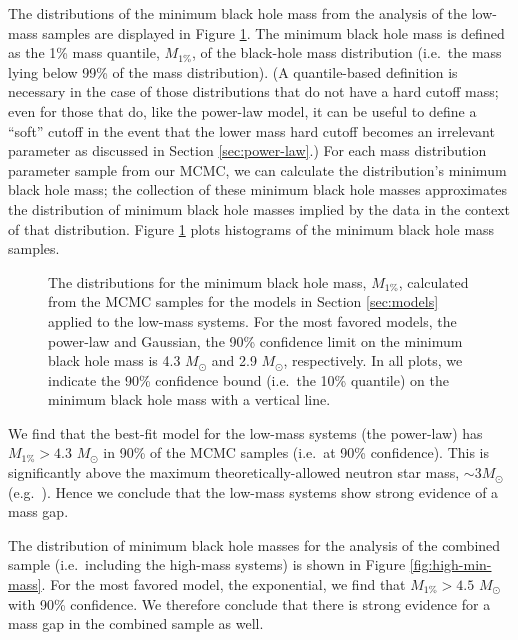 \documentclass[preprint]{aastex}
\newcommand{\Msun}{M_\odot}
\begin{document}
The distributions of the minimum black hole mass from the analysis of
the low-mass samples are displayed in Figure \ref{fig:min-mass}.  The
minimum black hole mass is defined as the 1\% mass quantile,
$M_{1\%}$, of the black-hole mass distribution (i.e.\ the mass lying
below 99\% of the mass distribution).  (A quantile-based definition is
necessary in the case of those distributions that do not have a hard
cutoff mass; even for those that do, like the power-law model, it can
be useful to define a ``soft'' cutoff in the event that the lower mass
hard cutoff becomes an irrelevant parameter as discussed in Section
\ref{sec:power-law}.)  For each mass distribution parameter sample
from our MCMC, we can calculate the distribution's minimum black hole
mass; the collection of these minimum black hole masses approximates
the distribution of minimum black hole masses implied by the data in
the context of that distribution.  Figure \ref{fig:min-mass} plots
histograms of the minimum black hole mass samples.

\begin{figure}
  \begin{center}
  \end{center}
  \caption{\label{fig:min-mass} The distributions for the minimum
    black hole mass, $M_{1\%}$, calculated from the MCMC samples for
    the models in Section \ref{sec:models} applied to the low-mass
    systems.  For the most favored models, the power-law and Gaussian,
    the 90\% confidence limit on the minimum black hole mass is 4.3
    $\Msun$ and 2.9 $\Msun$, respectively.  In all plots, we indicate
    the 90\% confidence bound (i.e.\ the 10\% quantile) on the minimum
    black hole mass with a vertical line.}
\end{figure}

We find that the best-fit model for the low-mass systems (the
power-law) has $M_{1\%} > 4.3$ $\Msun$ in 90\% of the MCMC samples
(i.e.\ at 90\% confidence).  This is significantly above the maximum
theoretically-allowed neutron star mass, $\sim 3 \Msun$ (e.g.\
\citet{Kalogera1996}).  Hence we conclude that the low-mass systems
show strong evidence of a mass gap.

The distribution of minimum black hole masses for the analysis of the
combined sample (i.e.\ including the high-mass systems) is shown in
Figure \ref{fig:high-min-mass}.  For the most favored model, the
exponential, we find that $M_{1\%} > 4.5$ $\Msun$ with 90\%
confidence.  We therefore conclude that there is strong evidence for a
mass gap in the combined sample as well.
\end{document}
